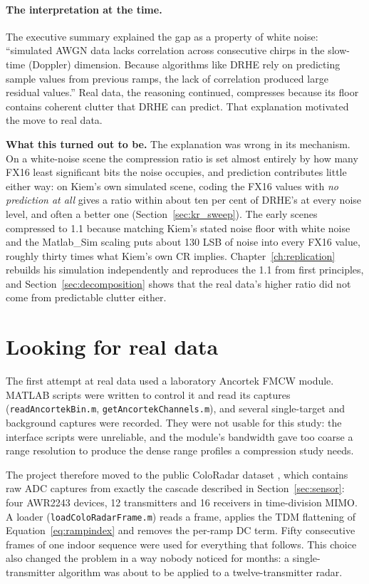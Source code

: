 \paragraph{The interpretation at the time.} The executive summary explained the
gap as a property of white noise: ``simulated AWGN data lacks correlation
across consecutive chirps in the slow-time (Doppler) dimension. Because
algorithms like DRHE rely on predicting sample values from previous ramps, the
lack of correlation produced large residual values.'' Real data, the
reasoning continued, compresses because its floor contains coherent clutter
that DRHE can predict. That explanation motivated the move to real data.

\begin{keybox}
\textbf{What this turned out to be.} The explanation was wrong in its
mechanism. On a white-noise scene the compression ratio is set almost entirely
by how many FX16 least significant bits the noise occupies, and prediction
contributes little either way: on Kiem's own simulated scene, coding the FX16
values with \emph{no prediction at all} gives a ratio within about ten per cent
of DRHE's at every noise level, and often a better one
(Section~\ref{sec:kr_sweep}). The early scenes
compressed to 1.1 because matching Kiem's stated noise floor with white noise
and the Matlab\_Sim scaling puts about 130 LSB of noise into every FX16 value,
roughly thirty times what Kiem's own CR implies. Chapter~\ref{ch:replication}
rebuilds his simulation independently and reproduces the 1.1 from first
principles, and Section~\ref{sec:decomposition} shows that the real data's
higher ratio did not come from predictable clutter either.
\end{keybox}

\section{Looking for real data}
\label{sec:jr_data}

The first attempt at real data used a laboratory Ancortek FMCW module. MATLAB
scripts were written to control it and read its captures
(\texttt{readAncortekBin.m}, \texttt{getAncortekChannels.m}), and several
single-target and background captures were recorded. They were not usable for
this study: the interface scripts were unreliable, and the module's bandwidth
gave too coarse a range resolution to produce the dense range profiles a
compression study needs.

The project therefore moved to the public ColoRadar dataset \cite{kramer2022},
which contains raw ADC captures from exactly the cascade described in
Section~\ref{sec:sensor}: four AWR2243 devices, 12 transmitters and 16
receivers in time-division MIMO. A loader (\texttt{loadColoRadarFrame.m})
reads a frame, applies the TDM flattening of Equation~\eqref{eq:rampindex} and
removes the per-ramp DC term. Fifty consecutive frames of one indoor sequence
were used for everything that follows. This choice also changed the problem in
a way nobody noticed for months: a single-transmitter algorithm was about to be
applied to a twelve-transmitter radar.

